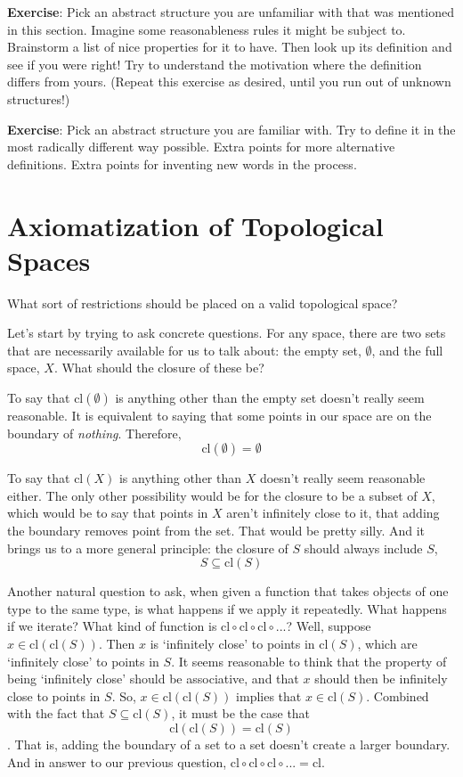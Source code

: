 \documentclass{report}
\newcommand{\cl}{\mathrm{cl}}
\begin{document}
{\bf Exercise}: Pick an abstract structure you are unfamiliar with that was mentioned in this section. Imagine some reasonableness rules it might be subject to. Brainstorm a list of nice properties for it to have. Then look up its definition and see if you were right! Try to understand the motivation where the definition differs from yours. (Repeat this exercise as desired, until you run out of unknown structures!)

{\bf Exercise}: Pick an abstract structure you are familiar with. Try to define it in the most radically different way possible. Extra points for more alternative definitions. Extra points for inventing new words in the process.

\section{Axiomatization of Topological Spaces}

What sort of restrictions should be placed on a valid topological space?

Let's start by trying to ask concrete questions. For any space, there are two sets that are necessarily available for us to talk about: the empty set, $∅$, and the full space, $X$. What should the closure of these be?

To say that $\cl(∅)$ is anything other than the empty set doesn't really seem reasonable. It is equivalent to saying that some points in our space are on the boundary of \emph{nothing}. Therefore, $$\cl(∅) = ∅$$

To say that $\cl(X)$ is anything other than $X$ doesn't really seem reasonable either. The only other possibility would be for the closure to be a subset of $X$, which would be to say that points in $X$ aren't infinitely close to it, that adding the boundary removes point from the set. That would be pretty silly. And it brings us to a more general principle: the closure of $S$ should always include $S$, $$S ⊆ \cl(S)$$

Another natural question to ask, when given a function that takes objects of one type to the same type, is what happens if we apply it repeatedly. What happens if we iterate? What kind of function is $\cl ∘ \cl ∘ \cl ∘ ...$? Well, suppose $x ∈ \cl(\cl(S))$. Then $x$ is `infinitely close' to points in $\cl(S)$, which are `infinitely close' to points in $S$. It seems reasonable to think that the property of being `infinitely close' should be associative, and that $x$ should then be infinitely close to points in $S$. So, $x ∈ \cl(\cl(S))$ implies that $x ∈ \cl(S)$. Combined with the fact that $S ⊆ \cl(S)$, it must be the case that $$\cl(\cl(S)) = \cl(S)$$. That is, adding the boundary of a set to a set doesn't create a larger boundary. And in answer to our previous question, $\cl ∘ \cl ∘ \cl ∘ ... = \cl$.
\end{document}
